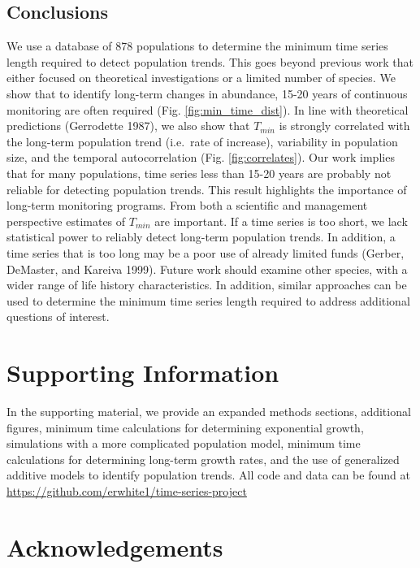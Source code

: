 \documentclass[12pt,]{article}
\begin{document}
\subsection{Conclusions}\label{conclusions}

We use a database of 878 populations to determine the minimum time
series length required to detect population trends. This goes beyond
previous work that either focused on theoretical investigations or a
limited number of species. We show that to identify long-term changes in
abundance, 15-20 years of continuous monitoring are often required (Fig.
\ref{fig:min_time_dist}). In line with theoretical predictions
(Gerrodette 1987), we also show that \(T_{min}\) is strongly correlated
with the long-term population trend (i.e.~rate of increase), variability
in population size, and the temporal autocorrelation (Fig.
\ref{fig:correlates}). Our work implies that for many populations, time
series less than 15-20 years are probably not reliable for detecting
population trends. This result highlights the importance of long-term
monitoring programs. From both a scientific and management perspective
estimates of \(T_{min}\) are important. If a time series is too short,
we lack statistical power to reliably detect long-term population
trends. In addition, a time series that is too long may be a poor use of
already limited funds (Gerber, DeMaster, and Kareiva 1999). Future work
should examine other species, with a wider range of life history
characteristics. In addition, similar approaches can be used to
determine the minimum time series length required to address additional
questions of interest.

\section{Supporting Information}\label{supporting-information}

In the supporting material, we provide an expanded methods sections,
additional figures, minimum time calculations for determining
exponential growth, simulations with a more complicated population
model, minimum time calculations for determining long-term growth rates,
and the use of generalized additive models to identify population
trends. All code and data can be found at
\url{https://github.com/erwhite1/time-series-project}

\section{Acknowledgements}\label{acknowledgements}
\end{document}
